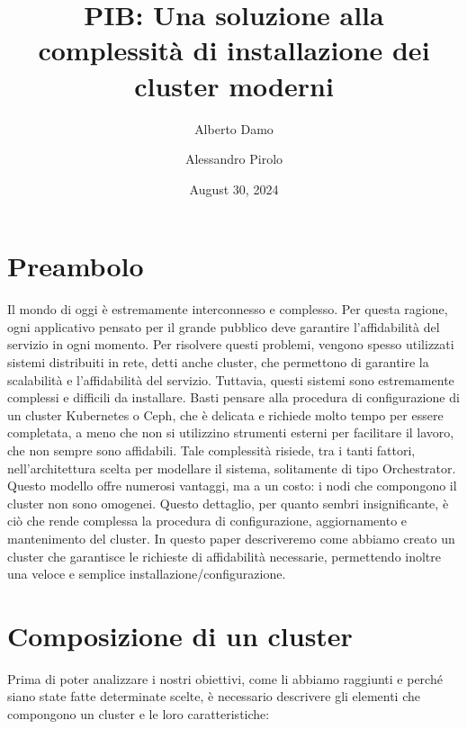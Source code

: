 \documentclass[a4paper]{article}
\title{PIB: Una soluzione alla complessità di installazione dei cluster moderni}
\author{Alberto Damo \and Alessandro Pirolo}
\date{August 30, 2024}
\begin{document}
\maketitle

\newpage
\tableofcontents
\newpage

\section{Preambolo}
Il mondo di oggi è estremamente interconnesso e complesso. Per questa ragione, ogni applicativo pensato per il grande pubblico deve garantire l'affidabilità del servizio in ogni momento. Per risolvere questi problemi, vengono spesso utilizzati sistemi distribuiti in rete, detti anche cluster, che permettono di garantire la scalabilità e l'affidabilità del servizio. Tuttavia, questi sistemi sono estremamente complessi e difficili da installare. Basti pensare alla procedura di configurazione di un cluster Kubernetes o Ceph, che è delicata e richiede molto tempo per essere completata, a meno che non si utilizzino strumenti esterni per facilitare il lavoro, che non sempre sono affidabili. Tale complessità risiede, tra i tanti fattori, nell'architettura scelta per modellare il sistema, solitamente di tipo Orchestrator. Questo modello offre numerosi vantaggi, ma a un costo: i nodi che compongono il cluster non sono omogenei. Questo dettaglio, per quanto sembri insignificante, è ciò che rende complessa la procedura di configurazione, aggiornamento e mantenimento del cluster. In questo paper descriveremo come abbiamo creato un cluster che garantisce le richieste di affidabilità necessarie, permettendo inoltre una veloce e semplice installazione/configurazione.

\section{Composizione di un cluster}
Prima di poter analizzare i nostri obiettivi, come li abbiamo raggiunti e perché siano state fatte determinate scelte, è necessario descrivere gli elementi che compongono un cluster e le loro caratteristiche:
\end{document}
